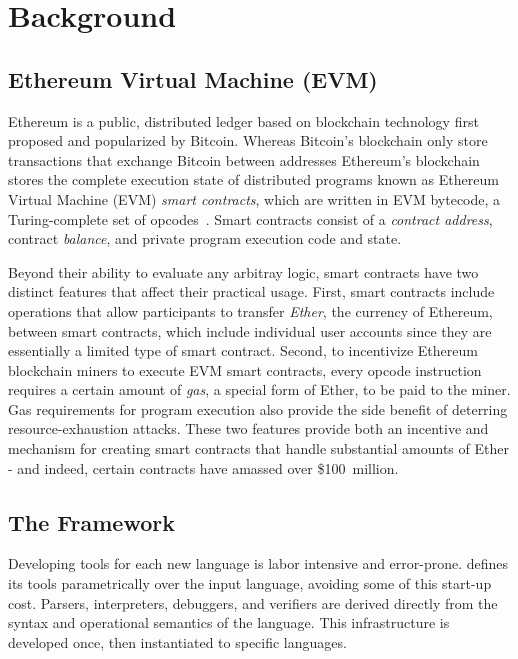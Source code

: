 \section{Background}

\subsection{Ethereum Virtual Machine (EVM)}

Ethereum is a public, distributed ledger based on blockchain technology first
proposed and popularized by Bitcoin. Whereas Bitcoin's blockchain only store
transactions that exchange Bitcoin between addresses Ethereum's blockchain
stores the complete execution state of distributed programs known as Ethereum
Virtual Machine (EVM) \textit{smart contracts}, which are written in EVM
bytecode, a Turing-complete set of \TK opcodes~\cite{yellowpaper}. Smart
contracts consist of a \textit{contract address}, contract \textit{balance}, and
private program execution code and state.

Beyond their ability to evaluate any arbitray logic, smart contracts have two
distinct features that affect their practical usage. First, smart contracts
include operations that allow participants to transfer \textit{Ether}, the
currency of Ethereum, between smart contracts, which include individual user
accounts since they are essentially a limited type of smart contract. Second, to
incentivize Ethereum blockchain miners to execute EVM smart contracts, every
opcode instruction requires a certain amount of \textit{gas}, a special form of
Ether, to be paid to the miner. Gas requirements for program execution also
provide the side benefit of deterring resource-exhaustion attacks. These two
features provide both an incentive and mechanism for creating smart contracts
that handle substantial amounts of Ether - and indeed, certain contracts have
amassed over \$100~million.

\subsection{The \K{} Framework}

Developing tools for each new language is labor intensive and error-prone. \K{}
defines its tools parametrically over the input language, avoiding some of this
start-up cost. Parsers, interpreters, debuggers, and verifiers are derived
directly from the syntax and operational semantics of the language. This
infrastructure is developed once, then instantiated to specific
languages.~\cite{stefanescu-park-yuwen-li-rosu-2016-oopsla}

